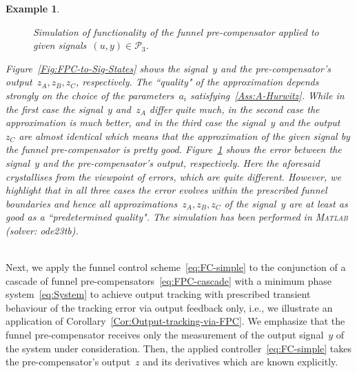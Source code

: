 \documentclass[ envcountsect, envcountsame]{svjour3}
\newtheorem{Example}[Theorem]{Example}
\newcommand{\cP}{\mathcal{P}}
\begin{document}
\begin{Example}
\begin{figure}[h!]
\begin{subfigure}[t]{0.49\textwidth}
\label{Fig:FPC-to-Sig-Errors}
\end{subfigure}
\caption{Simulation of functionality of the funnel pre-compensator applied to given signals~$(u,y) \in \cP_3$.}
\label{Fig:FPC-to-Sig}
\end{figure}
%
Figure~\ref{Fig:FPC-to-Sig-States} shows the signal~$y$ and the pre-compensator's output~$z_A, z_B, z_C$, respectively.
The ``quality" of the approximation depends strongly on the choice of the parameters~$a_i$ satisfying~\ref{Ass:A-Hurwitz}.
While in the first case the signal~$y$ and~$z_A$ differ quite much, in the second case the approximation is much better, and in the third case the signal~$y$ and the output~$z_C$ are almost identical which means that the approximation of the given signal by the funnel pre-compensator is pretty good.
Figure~\ref{Fig:FPC-to-Sig-Errors} shows the error between the signal~$y$ and the pre-compensator's output, respectively.
Here the aforesaid crystallises from the viewpoint of errors, which are quite different. 
However, we highlight that in all three cases the error evolves within the prescribed funnel boundaries and hence all approximations~$z_A, z_B, z_C$ of the signal~$y$ are at least as good as a ``predetermined quality".
The simulation has been performed in \textsc{Matlab} (solver: \textsf{ode23tb}).
\end{Example}

\ \\
Next, we apply the funnel control scheme~\eqref{eq:FC-simple} to the conjunction of a cascade of funnel pre-compensators~\eqref{eq:FPC-cascade} with a minimum phase system~\eqref{eq:System} 
to achieve output tracking with prescribed transient behaviour of the tracking error via output feedback only, i.e., we illustrate an application of Corollary~\ref{Cor:Output-tracking-via-FPC}.
We emphasize that the funnel pre-compensator receives only the measurement of the output signal~$y$ of the system under consideration.
Then, the applied controller~\eqref{eq:FC-simple} takes the pre-compensator's output~$z$ and its derivatives which are known explicitly.
%
\end{document}
